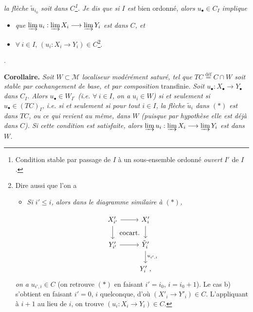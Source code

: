 \documentclass[11pt]{article}
\newcommand{\printedpage}[1]{\marginpar{\footnotesize p.~#1}}
\newcommand{\msp}[1]{\marginpar{\footnotesize [#1]}}
\begin{document}
\textit{la flèche $\tilde{u}_{i_0}$ soit dans $C$\footnote{Condition stable par passage de $I$ à un sous-ensemble ordonné \textit{ouvert} $I'$ de $I$.}. Je dis que si $I$ est} bien ordonné, \textit{alors $u_\bullet \in C_I$ implique}
\begin{itemize}[leftmargin=2.5em]
\item[a)] \textit{que $\varinjlim u_i : \varinjlim X_i \longrightarrow \varinjlim Y_i$ est dans $C$, et}
\item[b)] $\forall\ i \in I$, $(u_i : X_i \longrightarrow Y_i) \in C$\footnote{Dire aussi que l'on a
\begin{itemize}[leftmargin=2em]
\item[b$'$)] \textit{Si $i' \leq i$, alors dans le diagramme similaire à $(*)$,}
\end{itemize}
\[
\begin{tikzcd}[ampersand replacement=\&]
X'_{i'} \arrow[r] \arrow[d] \arrow[dr, phantom, "\text{cocart.}"] \& X'_i \arrow[d] \\
Y'_{i'} \arrow[r] \& \tilde{Y}'_i \arrow[d, "u_{i',i}"] \\
\& Y'_i\ ,
\end{tikzcd}
\]
\textit{on a} $u_{i',i} \in C$ (on retrouve $(*)$ en faisant $i' = i_0$, $i = i_0 + 1$). Le cas b) s'obtient en faisant $i' = 0$, $i$ quelconque, d'où $(X'_i \longrightarrow Y'_i) \in C$. L'appliquant à $i+1$ au lieu de $i$, on trouve $(u_i : X_i \longrightarrow Y_i) \in C$.}.
\end{itemize}

. %

\textbf{Corollaire.} \textit{Soit $W \subset \mathcal{M}$ localiseur modérément saturé, tel que $TC \overset{\text{déf}}{=} C \cap W$ soit stable par cochangement de base, et par composition} transfinie. \textit{Soit $u_\bullet : X_\bullet \longrightarrow Y_\bullet$ dans $C_I$. Alors $u_\bullet \in W_{I^{\circ}}$ (i.e. $\forall\ i \in I$, on a $u_i \in W$) si et seulement si $u_\bullet \in (TC)_I$, i.e. si et seulement si pour tout $i \in I$, la flèche $\tilde{u}_i$ dans $(*)$ est dans $TC$, ou ce qui}
\msp{page 2: none}
\printedpage{2}
\msp{page 3}
\textit{revient au même, dans $W$ (puisque par hypothèse elle est déjà dans $C$). Si cette condition est satisfaite, alors $\varinjlim u_i : \varinjlim X_i \longrightarrow \varinjlim Y_i$ est dans $W$.}

\end{document}
